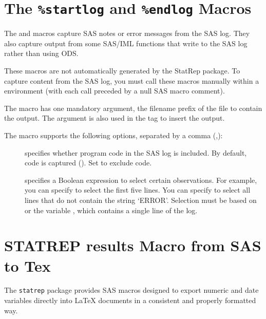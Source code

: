\documentclass[article,oneside]{memoir}
\newcommand*{\StatRep}{\textsf{StatRep}\xspace}
\begin{document}
 \section{The \texttt{\%startlog} and \texttt{\%endlog} Macros}\label{startlog}

  The  and  macros capture SAS notes
  or error messages from the SAS log. They also capture output
  from some SAS/IML functions that write to the SAS log rather than using ODS.

  These macros are not automatically generated by the \StatRep package.
  To capture content from the SAS log, you must call these macros
  manually within a  environment (with each call preceded
  by a null SAS macro comment).

  The  macro has one mandatory argument, the filename prefix
  of the file to contain the output. The argument is also used in the 
  tag to insert the output.

  The  macro supports the following options,
  separated by a comma (,):

  \begin{description}
  \item[] specifies whether program code in the SAS log is included.
  By default, code is captured (). Set  to exclude code.
  \item[] specifies a Boolean expression to select
  certain observations. For example, you can specify 
  to select the first five lines.  You can specify
   to select all lines that do not contain the string
  `ERROR'. Selection must be based on  or the variable , which
  contains a single line of the log.
  \end{description}

\section{STATREP results Macro from SAS to Tex}\label{SAStoTex}


The \texttt{statrep} package provides SAS macros designed to export numeric and date variables directly into \LaTeX{} documents in a consistent and properly formatted way. 
\end{document}
